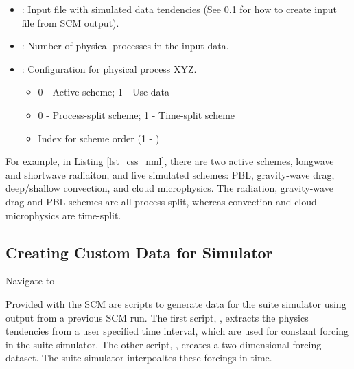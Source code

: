 \begin{itemize}
\item {}: Input file with simulated data tendencies (See \ref{section:Creating_Custom_Data_for_Simulator} for how to create input file from SCM output).
\item {}: Number of physical processes in the input data.
\item {}: Configuration for physical process XYZ.
\begin{itemize}
\item 0 - Active scheme; 1 - Use data
\item 0 - Process-split scheme; 1 - Time-split scheme
\item Index for scheme order (1 - )
\end{itemize}
\end{itemize}

For example, in Listing \ref{lst_css_nml}, there are two active schemes, longwave and shortwave radiaiton, and five simulated schemes: PBL, gravity-wave drag, deep/shallow convection, and cloud microphysics. The radiation, gravity-wave drag and PBL schemes are all process-split, whereas convection and cloud microphysics are time-split. 

\subsection{Creating Custom Data for Simulator}
\label{section:Creating_Custom_Data_for_Simulator}

Navigate to 

Provided with the SCM are scripts to generate data for the suite simulator using output from a previous SCM run. The first script, , extracts the physics tendencies from a user specified time interval, which are used for constant forcing in the suite simulator. The other script, , creates a two-dimensional forcing dataset. The suite simulator interpoaltes these forcings in time.


